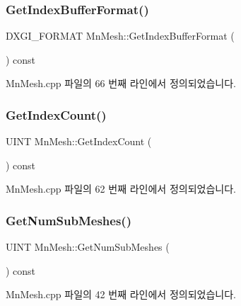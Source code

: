 \subsubsection{\texorpdfstring{Get\+Index\+Buffer\+Format()}{GetIndexBufferFormat()}}
{\footnotesize\ttfamily D\+X\+G\+I\+\_\+\+F\+O\+R\+M\+AT Mn\+Mesh\+::\+Get\+Index\+Buffer\+Format (\begin{DoxyParamCaption}{ }\end{DoxyParamCaption}) const}



Mn\+Mesh.\+cpp 파일의 66 번째 라인에서 정의되었습니다.

\mbox{\label{class_m_n_l_1_1_mn_mesh_aba80f0a52329029f340414c71cdfe8c8}} 
\subsubsection{\texorpdfstring{Get\+Index\+Count()}{GetIndexCount()}}
{\footnotesize\ttfamily U\+I\+NT Mn\+Mesh\+::\+Get\+Index\+Count (\begin{DoxyParamCaption}{ }\end{DoxyParamCaption}) const}



Mn\+Mesh.\+cpp 파일의 62 번째 라인에서 정의되었습니다.

\mbox{\label{class_m_n_l_1_1_mn_mesh_aee1f713bc53686879397376a064cdf2b}} 
\subsubsection{\texorpdfstring{Get\+Num\+Sub\+Meshes()}{GetNumSubMeshes()}}
{\footnotesize\ttfamily U\+I\+NT Mn\+Mesh\+::\+Get\+Num\+Sub\+Meshes (\begin{DoxyParamCaption}{ }\end{DoxyParamCaption}) const}



Mn\+Mesh.\+cpp 파일의 42 번째 라인에서 정의되었습니다.

\mbox{\label{class_m_n_l_1_1_mn_mesh_a04364fc880cefe0dfbf99c4196d25cfd}} 
